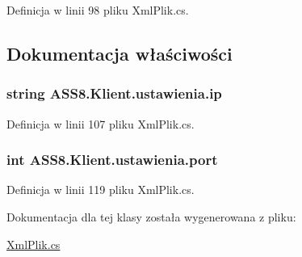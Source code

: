 Definicja w linii 98 pliku XmlPlik.cs.

\subsection{Dokumentacja właściwości}
\hypertarget{a00028_9aaac556989a57c37e8becb3a6067a5b}{
\subsubsection[{ip}]{\setlength{\rightskip}{0pt plus 5cm}string ASS8.Klient.ustawienia.ip}}
\label{dc/d3c/a00028_9aaac556989a57c37e8becb3a6067a5b}




Definicja w linii 107 pliku XmlPlik.cs.\hypertarget{a00028_f060f33463bbb7ece76cf9bbc4eec698}{
\subsubsection[{port}]{\setlength{\rightskip}{0pt plus 5cm}int ASS8.Klient.ustawienia.port}}
\label{dc/d3c/a00028_f060f33463bbb7ece76cf9bbc4eec698}




Definicja w linii 119 pliku XmlPlik.cs.

Dokumentacja dla tej klasy została wygenerowana z pliku:\begin{CompactItemize}
\item 
\hyperlink{a00054}{XmlPlik.cs}\end{CompactItemize}
